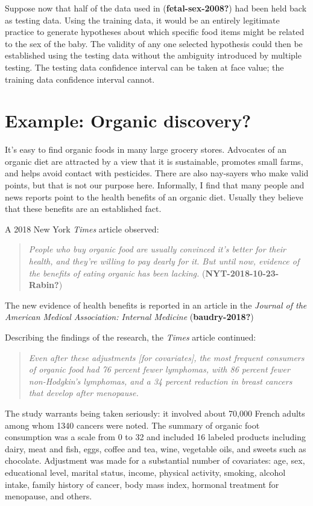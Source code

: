 \documentclass[
  letterpaper,
  DIV=11,
  numbers=noendperiod,
  oneside]{scrreprt}
\begin{document}
Suppose now that half of the data used in (\textbf{fetal-sex-2008?}) had
been held back as testing data. Using the training data, it would be an
entirely legitimate practice to generate hypotheses about which specific
food items might be related to the sex of the baby. The validity of any
one selected hypothesis could then be established using the testing data
without the ambiguity introduced by multiple testing. The testing data
confidence interval can be taken at face value; the training data
confidence interval cannot.

\hypertarget{example-organic-discovery}{%
\section{Example: Organic discovery?}\label{example-organic-discovery}}

It's easy to find organic foods in many large grocery stores. Advocates
of an organic diet are attracted by a view that it is sustainable,
promotes small farms, and helps avoid contact with pesticides. There are
also nay-sayers who make valid points, but that is not our purpose here.
Informally, I find that many people and news reports point to the health
benefits of an organic diet. Usually they believe that these benefits
are an established fact.

A 2018 New York \emph{Times} article observed:

\begin{quote}
\emph{People who buy organic food are usually convinced it's better for
their health, and they're willing to pay dearly for it. But until now,
evidence of the benefits of eating organic has been lacking.}
(\textbf{NYT-2018-10-23-Rabin?})
\end{quote}

The new evidence of health benefits is reported in an article in the
\emph{Journal of the American Medical Association: Internal Medicine}
(\textbf{baudry-2018?})

Describing the findings of the research, the \emph{Times} article
continued:

\begin{quote}
\emph{Even after these adjustments {[}for covariates{]}, the most
frequent consumers of organic food had 76 percent fewer lymphomas, with
86 percent fewer non-Hodgkin's lymphomas, and a 34 percent reduction in
breast cancers that develop after menopause.}
\end{quote}

The study warrants being taken seriously: it involved about 70,000
French adults among whom 1340 cancers were noted. The summary of organic
foot consumption was a scale from 0 to 32 and included 16 labeled
products including dairy, meat and fish, eggs, coffee and tea, wine,
vegetable oils, and sweets such as chocolate. Adjustment was made for a
substantial number of covariates: age, sex, educational level, marital
status, income, physical activity, smoking, alcohol intake, family
history of cancer, body mass index, hormonal treatment for menopause,
and others.
\end{document}
